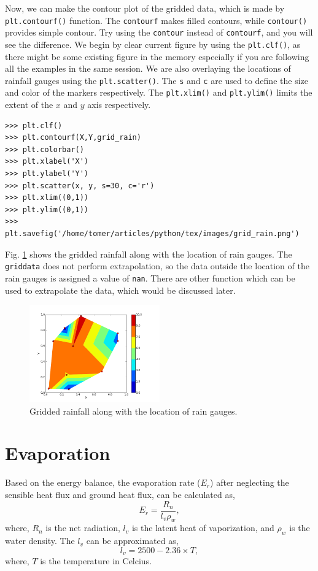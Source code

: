 \documentclass[10pt]{book}
\begin{document}
{Now, we can make the contour plot of the gridded data, which is made by \verb"plt.contourf()" function. The \verb"contourf" makes filled contours, while \verb"contour()" provides simple contour. Try using the \verb"contour" instead of \verb"contourf", and you will see the difference. We begin by clear current figure by using the \verb"plt.clf()", as there might be some existing figure in the memory especially if you are following all the examples in the same session. We are also overlaying the locations of rainfall gauges using the \verb"plt.scatter()". The \verb"s" and \verb"c" are used to define the size and color of the markers respectively. The \verb"plt.xlim()" and \verb"plt.ylim()" limits the extent of the $x$ and $y$ axis respectively. 
\beforeverb \begin{verbatim}
>>> plt.clf()
>>> plt.contourf(X,Y,grid_rain)
>>> plt.colorbar()
>>> plt.xlabel('X')
>>> plt.ylabel('Y')
>>> plt.scatter(x, y, s=30, c='r')
>>> plt.xlim((0,1))
>>> plt.ylim((0,1))
>>> plt.savefig('/home/tomer/articles/python/tex/images/grid_rain.png')
\end{verbatim} \afterverb
{}

Fig. \ref{fig:grid_rain} shows the gridded rainfall along with the location of rain gauges. The \verb"griddata" does not perform extrapolation, so the data outside the location of the rain gauges is assigned a value of \verb"nan". There are other function which can be used to extrapolate the data, which would be discussed later. 

\beforefig
\begin{figure}[h!]
  \centering
    \includegraphics[width=0.5\textwidth]{images/grid_rain.png}
  \caption{Gridded rainfall along with the location of rain gauges.}
   \label{fig:grid_rain}
\end{figure}
\afterfig

\section{Evaporation}
Based on the energy balance, the evaporation rate  ($E_r$) after neglecting the sensible heat flux and ground heat flux, can be calculated as,
\begin{equation}
E_r = \frac{R_n}{l_v\rho_w},
\end{equation}
where, $R_n$ is the net radiation, $l_v$ is the latent heat of vaporization, and $\rho_w$ is the water density. The $l_v$ can be approximated as,
\begin{equation}
l_v = 2500 - 2.36\times T,
\end{equation}
where, $T$ is the temperature in Celcius. \\


}
\end{document}
